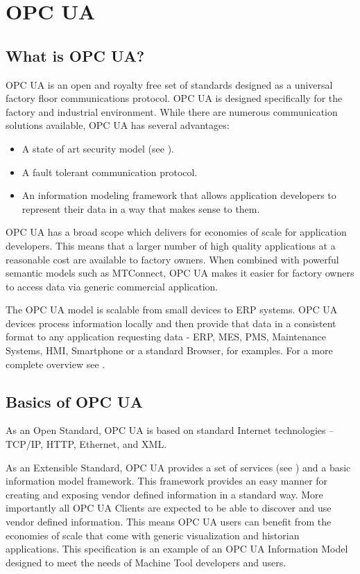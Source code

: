 \section{OPC UA}

\subsection{What is OPC UA?}

OPC UA is an open and royalty free set of standards designed as a universal factory floor communications protocol.
OPC UA is designed specifically for the factory and industrial environment. While there are numerous communication solutions available, OPC UA has several advantages:

\begin{itemize}
\item A state of art security model (see \cite{UAPart2}).
\item A fault tolerant communication protocol.
\item An information modeling framework that allows application developers to represent their data in a way that makes sense to them.
\end{itemize}

OPC UA has a broad scope which delivers for economies of scale for application developers. This means that a larger number of high quality applications at a reasonable cost are available to factory owners. When combined with powerful semantic models such as MTConnect, OPC UA makes it easier for factory owners to access data via generic commercial application.

The OPC UA model is scalable from small devices to ERP systems. OPC UA devices process information locally and then provide that data in a consistent format to any application requesting data - ERP, MES, PMS, Maintenance Systems, HMI, Smartphone or a standard Browser, for examples. For a more complete overview see \cite{UAPart1}.

\subsection{Basics of OPC UA}

As an Open Standard, OPC UA is based on standard Internet technologies – TCP/IP, HTTP, Ethernet, and XML.

As an Extensible Standard, OPC UA provides a set of services (see \cite{UAPart4}) and a basic information model framework. This framework provides an easy manner for creating and exposing vendor defined information in a standard way. More importantly all OPC UA Clients are expected to be able to discover and use vendor defined information. This means OPC UA users can benefit from the economies of scale that come with generic visualization and historian applications. This specification is an example of an OPC UA Information Model designed to meet the needs of Machine Tool developers and users.

